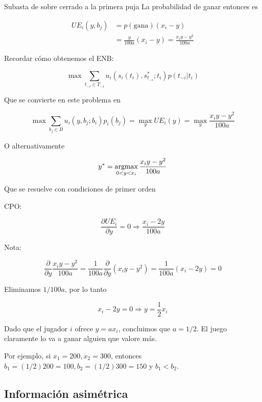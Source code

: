 \documentclass[12pt]{article}
\begin{document}
\begin{exbox}{Subasta de sobre cerrado a la primera puja}
	La probabilidad de ganar entonces es

	\begin{align*}
		UE_i(y, b_j) & =p(\text{gana})(x_i - y)                          \\
		             & =\frac{y}{100a}(x_i - y)=\frac{x_i y - y^2}{100a}
	\end{align*}

	Recordar cómo obtenemos el ENB:

	\[\max \sum_{t_{-i} \in T_{-i}} u_i(s_i(t_i), s_{t_{-i}}^*; t_i)p(t_{-i} | t_i) \]

	Que se convierte en este problema en

	\[\max \sum_{b_j \in B} u_i(y, b_j; b_i)p_i(b_j) = \max_{y} UE_i(y) = \max_y \frac{x_i y - y^2}{100a} \]

	O alternativamente

	\[ y^* = \operatorname*{argmax}_{0<y<x_i} \frac{x_i y - y^2}{100a} \]

	Que se resuelve con condiciones de primer orden

	CPO:

	\[
		\frac{\partial UE_i}{\partial y} = 0 \Longrightarrow \frac{x_i - 2y}{100a}
	\]

	Nota:

	\[
		\frac{\partial}{\partial y}\frac{x_i y - y^2}{100a} = \frac{1}{100a}\frac{\partial}{\partial y}(x_iy - y^2)=\frac{1}{100a}(x_i - 2y)=0
	\]

	Eliminamos $1/100a$, por lo tanto

	\[
		x_i - 2y = 0 \Longrightarrow y = \frac{1}{2}x_i
	\]

	Dado que el jugador $i$ ofrece $y=ax_i$, concluimos que $a = 1/2$. El juego claramente lo va a ganar alguien que valore más.

	Por ejemplo, si $x_1 = 200, x_2 = 300$, entonces $b_1 = (1/2)200 = 100, b_2 = (1/2)300 = 150$ y $b_1 < b_2$.

\end{exbox}

\subsection{Información asimétrica}
\end{document}

